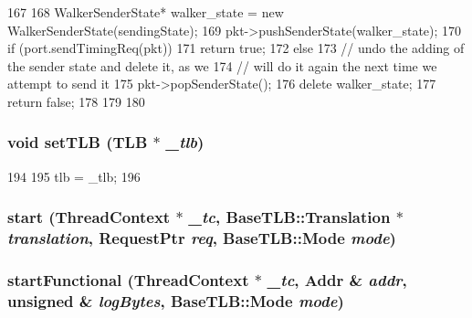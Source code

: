 \begin{DoxyCode}
167 {
168     WalkerSenderState* walker_state = new WalkerSenderState(sendingState);
169     pkt->pushSenderState(walker_state);
170     if (port.sendTimingReq(pkt)) {
171         return true;
172     } else {
173         // undo the adding of the sender state and delete it, as we
174         // will do it again the next time we attempt to send it
175         pkt->popSenderState();
176         delete walker_state;
177         return false;
178     }
179 
180 }
\end{DoxyCode}
\hypertarget{classX86ISA_1_1Walker_a57c4132ed7eb199686bbcfb0de7722ac}{
\subsubsection[{setTLB}]{\setlength{\rightskip}{0pt plus 5cm}void setTLB ({\bf TLB} $\ast$ {\em \_\-tlb})}}
\label{classX86ISA_1_1Walker_a57c4132ed7eb199686bbcfb0de7722ac}



\begin{DoxyCode}
194         {
195             tlb = _tlb;
196         }
\end{DoxyCode}
\hypertarget{classX86ISA_1_1Walker_af431777dfd02888658d8bf01cc7ee789}{
\subsubsection[{start}]{ start ({\bf ThreadContext} $\ast$ {\em \_\-tc}, \/  {\bf BaseTLB::Translation} $\ast$ {\em translation}, \/  {\bf RequestPtr} {\em req}, \/  {\bf BaseTLB::Mode} {\em mode})}}
\label{classX86ISA_1_1Walker_af431777dfd02888658d8bf01cc7ee789}
\hypertarget{classX86ISA_1_1Walker_ad0337e2c2472a149328d21cd4310165f}{
\subsubsection[{startFunctional}]{ startFunctional ({\bf ThreadContext} $\ast$ {\em \_\-tc}, \/  {\bf Addr} \& {\em addr}, \/  unsigned \& {\em logBytes}, \/  {\bf BaseTLB::Mode} {\em mode})}}
\label{classX86ISA_1_1Walker_ad0337e2c2472a149328d21cd4310165f}



